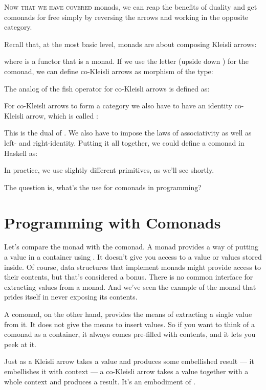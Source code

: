 
\lettrine[lhang=0.17]{N}{ow that we have covered} monads, we can reap the benefits of duality and
get comonads for free simply by reversing the arrows and working in the
opposite category.

Recall that, at the most basic level, monads are about composing Kleisli
arrows:

where  is a functor that is a monad. If we use the letter
 (upside down ) for the comonad, we can define
co-Kleisli arrows as morphism of the type:

The analog of the fish operator for co-Kleisli arrows is defined as:

For co-Kleisli arrows to form a category we also have to have an
identity co-Kleisli arrow, which is called :

This is the dual of . We also have to impose the laws of
associativity as well as left- and right-identity. Putting it all
together, we could define a comonad in Haskell as:

In practice, we use slightly different primitives, as we'll see shortly.

The question is, what's the use for comonads in programming?

\section{Programming with Comonads}

Let's compare the monad with the comonad. A monad provides a way of
putting a value in a container using . It doesn't give
you access to a value or values stored inside. Of course, data
structures that implement monads might provide access to their contents,
but that's considered a bonus. There is no common interface for
extracting values from a monad. And we've seen the example of the
 monad that prides itself in never exposing its contents.

A comonad, on the other hand, provides the means of extracting a single
value from it. It does not give the means to insert values. So if you
want to think of a comonad as a container, it always comes pre-filled
with contents, and it lets you peek at it.

Just as a Kleisli arrow takes a value and produces some embellished
result --- it embellishes it with context --- a co-Kleisli arrow takes a
value together with a whole context and produces a result. It's an
embodiment of .

